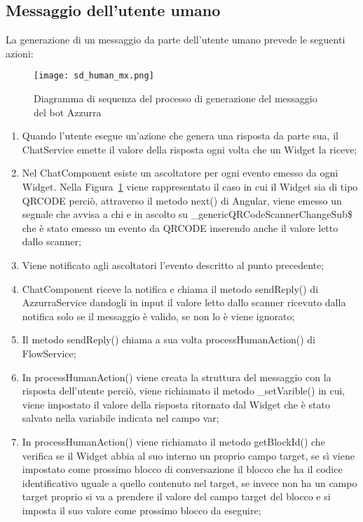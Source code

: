 \subsection{Messaggio dell’utente  umano}
La generazione di un messaggio da parte dell’utente umano prevede le seguenti azioni:\\
\begin{figure}[htbp]
	\centering
	\texttt{[image: sd\_human\_mx.png]}
	\caption{Diagramma di sequenza del processo di generazione del messaggio del bot Azzurra}\label{fig:mxHuman}
\end{figure}
\begin{enumerate}
	\item Quando l'utente esegue un'azione che genera una risposta da parte sua, il ChatService emette il valore della risposta ogni volta che un Widget la riceve;
	\item Nel ChatComponent esiste un ascoltatore per ogni evento emesso da ogni Widget. Nella Figura~\ref{fig:mxHuman} viene rappresentato il caso in cui il Widget sia di tipo QRCODE perciò, attraverso il metodo next() di Angular, viene emesso un segnale che avvisa a chi e in ascolto su  \_genericQRCodeScannerChangeSub\$ che è stato emesso un evento da QRCODE inserendo anche il valore letto dallo scanner;
	\item Viene notificato agli ascoltatori l'evento descritto al punto precedente;
	\item ChatComponent riceve la notifica e chiama il metodo sendReply() di AzzurraService dandogli in input il valore letto dallo scanner ricevuto dalla notifica solo se il messaggio è valido, se non lo è viene ignorato;	
	\item Il metodo sendReply() chiama a sua volta processHumanAction() di FlowService;
	\item In processHumanAction() viene creata la struttura del messaggio con la risposta dell'utente perciò, viene richiamato il metodo \_setVarible() in cui, viene impostato il valore della risposta ritornato dal Widget che è stato salvato nella variabile indicata nel campo var;
	\item In processHumanAction() viene richiamato il metodo getBlockId() che verifica se il Widget abbia al suo interno un proprio campo target, se sì viene impostato come prossimo blocco di conversazione il blocco che ha il codice identificativo uguale a quello contenuto nel target, se invece non ha un campo target proprio si va a prendere il valore del campo target del blocco e si imposta il suo valore come prossimo blocco da eseguire;

\end{enumerate}
